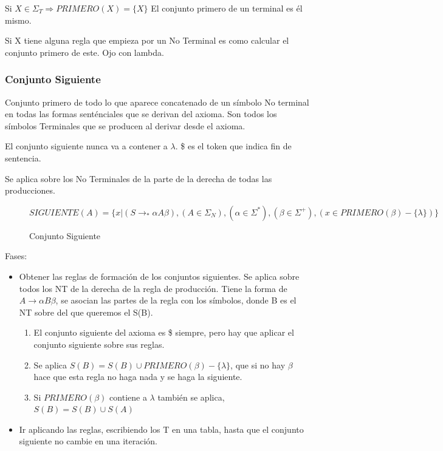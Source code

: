 \documentclass[12pt, twoside, openright]{report} %
\begin{document}
Si \(X \in \Sigma_T \Rightarrow PRIMERO(X)=\{X\}\) El conjunto primero
de un terminal es él mismo.

Si X tiene alguna regla que empieza por un No Terminal es como calcular
el conjunto primero de este. Ojo con lambda.


\subsubsection{Conjunto Siguiente}

Conjunto primero de todo lo que aparece concatenado de un símbolo No
terminal en todas las formas senténciales que se derivan del axioma. Son
todos los símbolos Terminales que se producen al derivar desde el
axioma.

El conjunto siguiente nunca va a contener a \(\lambda\). \$ es el token
que indica fin de sentencia.

Se aplica sobre los No Terminales de la parte de la derecha de todas las
producciones. 
\begin{figure}[H]
  $SIGUIENTE(A)=\{ x | (S \rightarrow _*\alpha A \beta), (A \in \Sigma_N), (\alpha \in \Sigma^*), (\beta \in \Sigma^+),(x\in PRIMERO(\beta)-\{\lambda\})\}$

  \captionsetup{justification=centering}
  \caption{Conjunto Siguiente}
\end{figure}
Fases:

\begin{itemize}

\item
  Obtener las reglas de formación de los conjuntos siguientes. Se aplica
  sobre todos los NT de la derecha de la regla de producción. Tiene la
  forma de \(A \rightarrow \alpha B \beta\), se asocian las partes de la
  regla con los símbolos, donde B es el NT sobre del que queremos el
  S(B).

\begin{enumerate}
\def\labelenumi{\arabic{enumi}.}
\item
  El conjunto siguiente del axioma es \$ siempre, pero hay que aplicar
  el conjunto siguiente sobre sus reglas.
\item
  Se aplica \(S(B)=S(B)\cup PRIMERO(\beta)-\{\lambda\}\), que si no hay
  \(\beta\) hace que esta regla no haga nada y se haga la siguiente.
\item
  Si \(PRIMERO(\beta)\) contiene a \(\lambda\) también se aplica,
  \(S(B)=S(B)\cup S(A)\)
\end{enumerate}


\item
  Ir aplicando las reglas, escribiendo los T en una tabla, hasta que el
  conjunto siguiente no cambie en una iteración.
\end{itemize}
\end{document}
